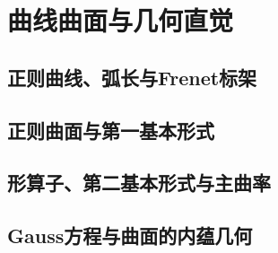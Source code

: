 \chapter{曲线曲面与几何直觉}
\label{ch:02-curves-surfaces}

\section{正则曲线、弧长与Frenet标架}


\section{正则曲面与第一基本形式}


\section{形算子、第二基本形式与主曲率}


\section{Gauss方程与曲面的内蕴几何}



